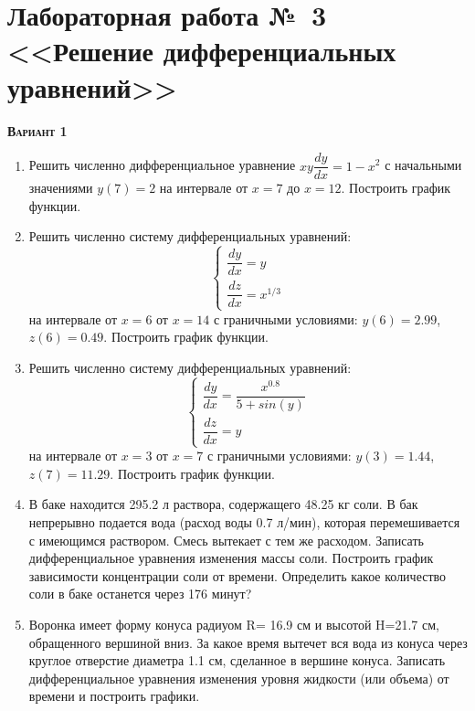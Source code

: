 \section{Лабораторная работа №~3 <<Решение дифференциальных уравнений>>}

 \addtocounter{nlab}{1}\textsc{\textbf{Вариант 1}}
\begin{enumerate}
\item Решить численно дифференциальное уравнение $xy\dfrac{dy}{dx}=1-x^2                $ с начальными значениями $y(     7)=     2$ на интервале от $x=     7$ до $x=    12$. Построить график функции.\item Решить численно систему дифференциальных уравнений:
 \begin{equation*}
\left\{
\begin{gathered}
\dfrac{dy}{dx}=y                     \\
\dfrac{dz}{dx}=x^{1/3}               
\end{gathered}
\right.
\end{equation*}
на интервале от $x= 6$ от $x=14$ с граничными условиями: $y( 6)=2.99$, $z( 6)=0.49$. Построить график функции. 
\item Решить численно систему дифференциальных уравнений:
 \begin{equation*}
\left\{
\begin{gathered}
\dfrac{dy}{dx}=\dfrac{x^{0.8}}{5+sin(y)}\\
\dfrac{dz}{dx}=y
\end{gathered}
\right.
\end{equation*}
на интервале от $x= 3$ от $x= 7$ с граничными условиями: $y( 3)=1.44$, $z( 7)=11.29$.  Построить график функции. 
\item  В баке находится 295.2 л раствора, содержащего 48.25 кг соли. В бак непрерывно подается вода (расход воды 0.7 л/мин), которая перемешивается с имеющимся раствором. Смесь вытекает с тем же расходом. Записать дифференциальное уравнения изменения массы соли. Построить график зависимости концентрации соли от времени. Определить какое количество соли в баке останется через  176 минут?

\item  Воронка имеет форму конуса радиуом R= 16.9 см и высотой H=21.7 см, обращенного вершиной вниз. За какое время вытечет вся вода из конуса через круглое отверстие диаметра 1.1 см, сделанное в вершине конуса. Записать дифференциальное уравнения изменения уровня жидкости (или объема) от времени и построить графики.

\end{enumerate}
